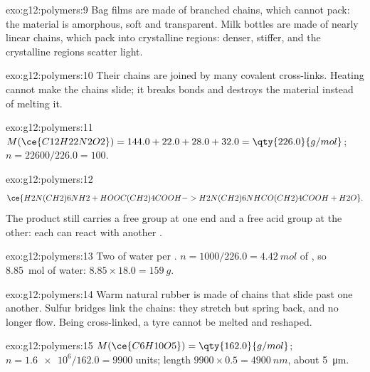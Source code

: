 \begin{solution}{exo:g12:polymers:9}
Bag films are made of branched chains, which cannot pack: the material
is amorphous, soft and transparent. Milk bottles are made of nearly
linear chains, which pack into crystalline regions: denser, stiffer, and
the crystalline regions scatter light.
\end{solution}

\begin{solution}{exo:g12:polymers:10}
Their chains are joined by many covalent cross-links. Heating cannot
make the chains slide; it breaks bonds and destroys the material instead
of melting it.
\end{solution}

\begin{solution}{exo:g12:polymers:11}
$M(\ce{C12H22N2O2}) = 144.0 + 22.0 + 28.0 + 32.0 = \qty{226.0}{g/mol}$;
$n = 22600/226.0 = 100$.
\end{solution}

\begin{solution}{exo:g12:polymers:12}
\[
  \ce{H2N(CH2)6NH2 + HOOC(CH2)4COOH -> H2N(CH2)6NHCO(CH2)4COOH + H2O} .
\]
The product still carries a free  group at one end and a free acid
group at the other: each can react with another .
\end{solution}

\begin{solution}{exo:g12:polymers:13}
Two  of water per . $n = 1000/226.0 =
\qty{4.42}{mol}$ of , so \qty{8.85}{mol} of water:
$8.85 \times 18.0 = \qty{159}{g}$.
\end{solution}

\begin{solution}{exo:g12:polymers:14}
Warm natural rubber is made of chains that slide past one another.
Sulfur bridges link the chains: they stretch but spring back, and no
longer flow. Being cross-linked, a tyre cannot be melted and reshaped.
\end{solution}

\begin{solution}{exo:g12:polymers:15}
$M(\ce{C6H10O5}) = \qty{162.0}{g/mol}$; $n = \num{1.6e6}/162.0 = 9900$
units; length $9900 \times 0.5 = \qty{4900}{nm}$, about
\qty{5}{\micro m}.
\end{solution}

